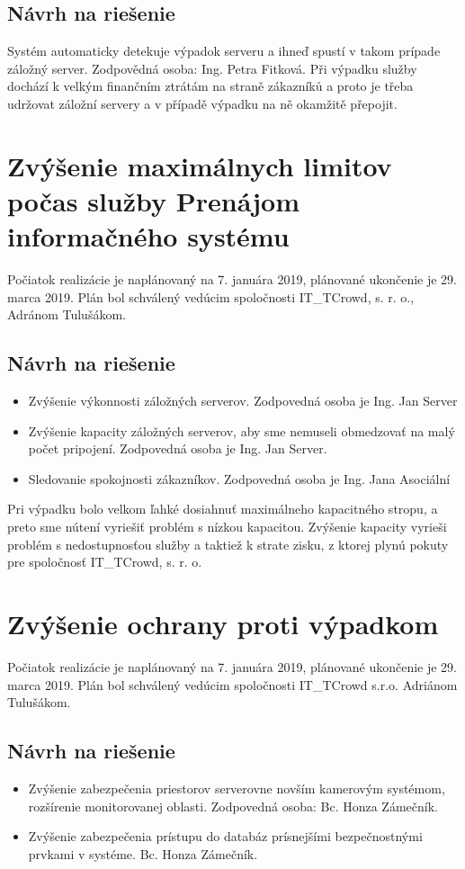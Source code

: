 \documentclass[a4paper, 11pt]{article}
\begin{document}
\subsection*{Návrh na riešenie}
Systém automaticky detekuje výpadok serveru a ihneď spustí v takom prípade záložný server. Zodpovědná osoba: Ing. Petra Fitková. Při výpadku služby dochází k velkým finančním ztrátám na straně zákazníků a proto je třeba udržovat záložní servery a v případě výpadku na ně okamžitě přepojit.

\section*{Zvýšenie maximálnych limitov počas služby Prenájom informačného systému}
Počiatok realizácie je naplánovaný na 7. januára 2019, plánované ukončenie je 29. marca 2019. Plán bol schválený vedúcim spoločnosti IT\_TCrowd, s. r. o., Adránom Tulušákom.

\subsection*{Návrh na riešenie}
\begin{itemize}
\item Zvýšenie výkonnosti záložných serverov. Zodpovedná osoba je Ing. Jan Server
\item Zvýšenie kapacity záložných serverov, aby sme nemuseli obmedzovať na malý počet pripojení. Zodpovedná osoba je Ing. Jan Server.
\item Sledovanie spokojnosti zákazníkov. Zodpovedná osoba je Ing. Jana Asociální
\end{itemize}

Pri výpadku bolo velkom ľahké dosiahnuť maximálneho kapacitného stropu, a preto sme nútení vyriešiť problém s nízkou kapacitou. Zvýšenie kapacity vyrieši problém s nedostupnosťou služby a taktiež k strate zisku, z ktorej plynú pokuty pre spoločnosť IT\_TCrowd, s. r. o.

\section*{Zvýšenie ochrany proti výpadkom}
Počiatok realizácie je naplánovaný na 7. januára 2019, plánované ukončenie je 29. marca 2019. Plán bol schválený vedúcim spoločnosti IT\_TCrowd s.r.o. Adriánom Tulušákom.

\subsection*{Návrh na riešenie}
\begin{itemize}
\item Zvýšenie zabezpečenia priestorov serverovne novším kamerovým systémom, rozšírenie monitorovanej oblasti. Zodpovedná osoba: Bc. Honza Zámečník.
\item Zvýšenie zabezpečenia prístupu do databáz prísnejšími bezpečnostnými prvkami v systéme. Bc. Honza Zámečník.
\end{itemize}
\end{document}
